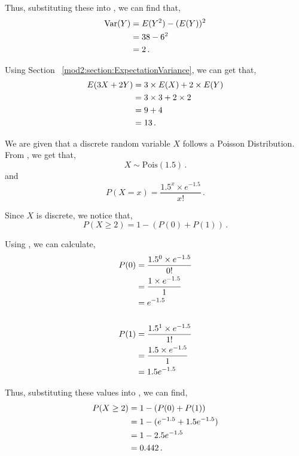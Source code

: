 \begin{subquestions}
\begin{subsubquestions}
Thus, substituting these into , we can find that,
\begin{align}
	\text{Var}(Y) & = E(Y^2) - (E(Y))^2  \nonumber \\
	           & = 38 - 6^2 \nonumber \\
	           & = 2 \,.
\end{align}


\subsubquestion

Using Section ~\ref{mod2:section:ExpectationVariance}, we can get that,
\begin{align}
	E(3X+2Y) & = 3\times E(X) + 2\times E(Y) \nonumber \\
	         & = 3 \times 3 + 2 \times 2 \nonumber \\
	         & = 9+4 \nonumber \\
	         & = 13 \,.
\end{align}

\end{subsubquestions}


\subquestion

We are given that a discrete random variable $X$ follows a Poisson Distribution. From , we get that,
\begin{equation}
	X \sim \text{Pois}(1.5) \,.
\end{equation}
and 
\begin{equation}
	P(X = x) =\frac{ 1.5^x \times e^{-1.5}}{x!} \,. \label{2008J:q4:Pois1}
\end{equation}

Since $X$ is discrete, we notice that,
\begin{equation}
	P(X \geq 2) = 1 - (P(0)+P(1)) \,. \label{2008J:q4:Pois2}
\end{equation}

Using , we can calculate,
\begin{align}
	P(0) & = \frac{ 1.5^0 \times e^{-1.5}}{0!} \nonumber \\
	     & = \frac{ 1 \times e^{-1.5}}{1} \nonumber \\
	     & = e^{-1.5} \\ \nonumber \\
	P(1) & = \frac{ 1.5^1 \times e^{-1.5}}{1!} \nonumber \\
	     & = \frac{1.5 \times e^{-1.5}}{1} \nonumber \\
	     & = 1.5e^{-1.5} 	
\end{align}

Thus, substituting these values into , we can find,
\begin{align}	     
	    P(X \geq 2) & = 1 - (P(0)+P(1)) \nonumber \\
	            & = 1 - (e^{-1.5} + 1.5e^{-1.5}) \nonumber \\
	            & = 1-2.5e^{-1.5} \nonumber \\
	            & = 0.442 \,.
\end{align}

\end{subquestions}